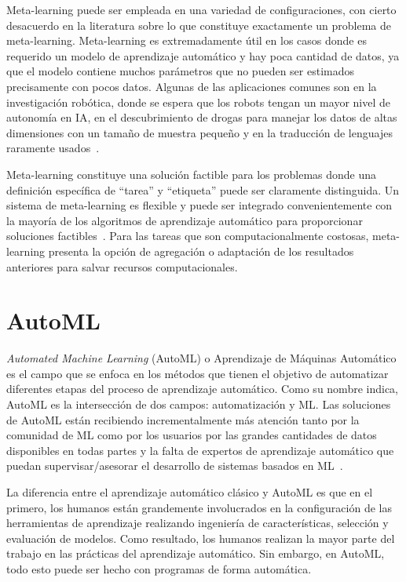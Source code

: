 Meta-learning puede ser empleada en una variedad de configuraciones, con cierto
desacuerdo en la literatura sobre lo que constituye exactamente un problema de
meta-learning. Meta-learning es extremadamente útil en los casos donde es
requerido un modelo de aprendizaje automático y hay poca cantidad de datos,
ya que el modelo contiene muchos parámetros que no pueden ser estimados
precisamente con pocos datos. Algunas de las aplicaciones comunes son en la
investigación robótica, donde se espera que los robots tengan un mayor nivel
de autonomía en IA, en el descubrimiento de drogas para manejar los datos de 
altas dimensiones con un tamaño de muestra pequeño y en la traducción de
lenguajes raramente usados~.

Meta-learning constituye una solución factible para los problemas donde una
definición específica de ``tarea'' y ``etiqueta'' puede ser claramente
distinguida. Un sistema de meta-learning es flexible y puede ser
integrado convenientemente con la mayoría de los algoritmos de aprendizaje
automático para proporcionar soluciones factibles~.
Para las tareas que son computacionalmente costosas, meta-learning presenta la
opción de agregación o adaptación de los resultados anteriores para salvar
recursos computacionales.

\section{AutoML}\label{section:AutoML}

\textit{Automated Machine Learning} (AutoML) o Aprendizaje de Máquinas
Automático es el campo que se enfoca en los métodos que tienen el objetivo de
automatizar diferentes etapas del proceso de aprendizaje automático. Como su
nombre indica, AutoML es la intersección de dos campos: automatización y ML.
Las soluciones de AutoML están recibiendo incrementalmente más atención tanto
por la comunidad de ML como por los usuarios por las grandes cantidades de
datos disponibles en todas partes y la falta de expertos de aprendizaje
automático que puedan supervisar/asesorar el desarrollo de sistemas basados en
ML~.

La diferencia entre el aprendizaje automático clásico y AutoML es que en el
primero, los humanos están grandemente involucrados en la configuración de las
herramientas de aprendizaje realizando ingeniería de características, selección
y evaluación de modelos. Como resultado, los humanos realizan la mayor parte
del trabajo en las prácticas del aprendizaje automático. Sin embargo, en
AutoML, todo esto puede ser hecho con programas de forma automática.

